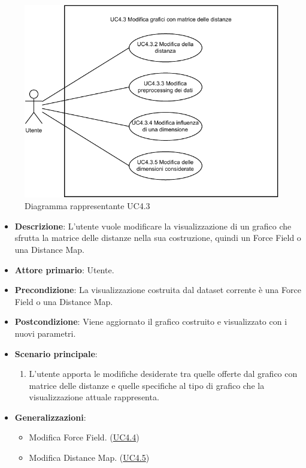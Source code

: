 \begin{figure}[h]
    \centering
    \includegraphics[width=0.8  \textwidth]{componenti/casi-duso/diagrammi/UC4_3.pdf}
    \caption{Diagramma rappresentante UC4.3}
    \label{fig:UC4.3}
\end{figure}

\begin{itemize}
    \item \textbf{Descrizione}: L’utente vuole modificare la visualizzazione di un grafico che sfrutta la matrice delle distanze
                                nella sua costruzione, quindi un Force Field o una Distance Map.
    \item \textbf{Attore primario}: Utente.
    \item \textbf{Precondizione}: La visualizzazione costruita dal dataset corrente è una Force Field o una Distance Map. 
    \item \textbf{Postcondizione}: Viene aggiornato il grafico costruito e visualizzato con i nuovi parametri.
    \item \textbf{Scenario principale}:
    \begin{enumerate}
        \item   L’utente apporta le modifiche desiderate tra quelle offerte dal grafico con matrice
                delle distanze e quelle specifiche al tipo di grafico che la visualizzazione attuale rappresenta.
    \end{enumerate}
    \item \textbf{Generalizzazioni}:
    \begin{itemize}
        \item Modifica Force Field. (\hyperref[ssub:uc4.4]{UC4.4}) 
        \item Modifica Distance Map. (\hyperref[ssub:uc4.5]{UC4.5}) 
    \end{itemize}
\end{itemize}


